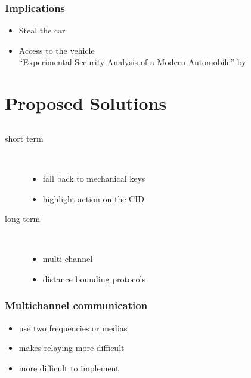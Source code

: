 \documentclass[12pt]{beamer}
\begin{document}
	\begin{frame}
		\frametitle{Implications}
			\begin{itemize}
				\item Steal the car
				\onslide<2-2>
				\item Access to the vehicle \\
				\textrightarrow ``Experimental Security Analysis of a Modern Automobile'' by	\citet{expModernAuto}
			\end{itemize}
	\end{frame}

\section{Proposed Solutions}
\subsection*{}
	\begin{frame}
		\frametitle{}
		\begin{description}
			\item[short term] \hfill \\
				\begin{itemize}
					\item fall back to mechanical keys 
					\item highlight action on the CID
				\end{itemize}
			\item[long term] \hfill \\
				\begin{itemize}
					\item	multi channel \citep{multichannelPrevRelay}
					\item distance bounding protocols \citep{distanceBoundingProtocols}
				\end{itemize}
		\end{description}
	\end{frame}

	\begin{frame}
		\frametitle{Multichannel communication}
			\begin{itemize}
				\item use two frequencies or medias
				\item makes relaying more difficult %
				\item more difficult to implement
			\end{itemize}
	\end{frame}
\end{document}

